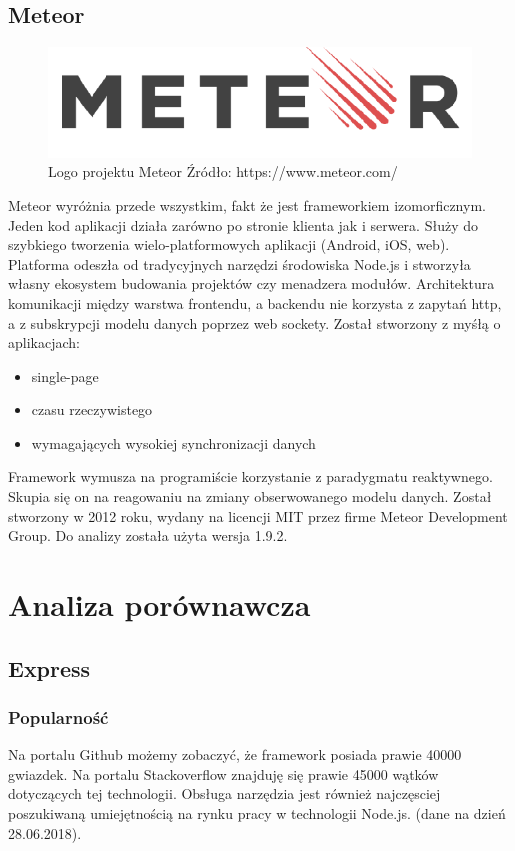 \documentclass[12pt]{report}
\begin{document}
  \section{Meteor}
    \begin{figure}[!hb]
      \centering
      \includegraphics[width=\textwidth,height=\textheight,keepaspectratio]{logo_meteor.png} 
      \caption{Logo projektu Meteor \newline Źródło: https://www.meteor.com/}
    \end{figure}
    Meteor wyróżnia przede wszystkim, fakt że jest frameworkiem izomorficznym. 
    Jeden kod aplikacji działa zarówno po stronie klienta jak i serwera.
    Służy do szybkiego tworzenia wielo-platformowych aplikacji (Android, iOS, web).
    Platforma odeszła od tradycyjnych narzędzi środowiska Node.js i stworzyła własny ekosystem budowania projektów czy menadzera modułów.
    Architektura komunikacji między warstwa frontendu, a backendu nie korzysta z zapytań http, a z subskrypcji modelu danych poprzez web sockety.
    Został stworzony z myśłą o aplikacjach:
    \begin{itemize}
      \item single-page 
      \item czasu rzeczywistego
      \item wymagających wysokiej synchronizacji danych
    \end{itemize} 
    Framework wymusza na programiście korzystanie z paradygmatu reaktywnego.
    Skupia się on na reagowaniu na zmiany obserwowanego modelu danych.
    Został stworzony w 2012 roku, wydany na licencji MIT przez firme Meteor Development Group.
    Do analizy została użyta wersja 1.9.2.

\chapter{Analiza porównawcza}

  \section{Express}
    \subsection{Popularność}
      Na portalu Github możemy zobaczyć, że framework posiada prawie 40000 gwiazdek.
      Na portalu Stackoverflow znajduję się prawie 45000 wątków dotyczących tej technologii.
      Obsługa narzędzia jest również najczęsciej poszukiwaną umiejętnością na rynku pracy w technologii Node.js.
      (dane na dzień 28.06.2018).
\end{document}
